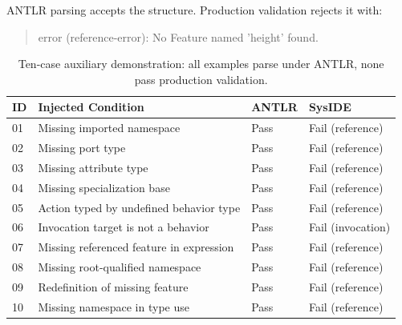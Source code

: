 ANTLR parsing accepts the structure. Production validation rejects it with:
\begin{quote}
\small\ttfamily
error (reference-error): No Feature named 'height' found.
\end{quote}

\begin{table}[H]
\centering
\caption{Ten-case auxiliary demonstration: all examples parse under ANTLR, none pass production validation.}
\label{tab:antlr_vs_syside_10cases}
\scriptsize
\setlength{\tabcolsep}{3pt}
\begin{tabular}{p{} p{} p{} p{}}
\toprule
\textbf{ID} & \textbf{Injected Condition} & \textbf{ANTLR} & \textbf{SysIDE} \\
\midrule
01 & Missing imported namespace & Pass & Fail (reference) \\
02 & Missing port type & Pass & Fail (reference) \\
03 & Missing attribute type & Pass & Fail (reference) \\
04 & Missing specialization base & Pass & Fail (reference) \\
05 & Action typed by undefined behavior type & Pass & Fail (reference) \\
06 & Invocation target is not a behavior & Pass & Fail (invocation) \\
07 & Missing referenced feature in expression & Pass & Fail (reference) \\
08 & Missing root-qualified namespace & Pass & Fail (reference) \\
09 & Redefinition of missing feature & Pass & Fail (reference) \\
10 & Missing namespace in type use & Pass & Fail (reference) \\
\bottomrule
\end{tabular}
\end{table}
